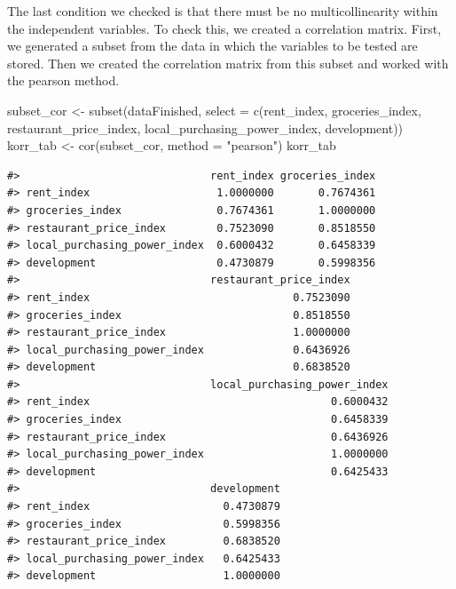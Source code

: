 \documentclass[
  11pt,
  a4paper,
  twoside]{scrbook}
\newenvironment{Shaded}{\begin{snugshade}}{\end{snugshade}}
\newcommand{\AttributeTok}[1]{\textcolor[rgb]{0.77,0.63,0.00}{#1}}
\newcommand{\FunctionTok}[1]{\textcolor[rgb]{0.00,0.00,0.00}{#1}}
\newcommand{\NormalTok}[1]{#1}
\newcommand{\OtherTok}[1]{\textcolor[rgb]{0.56,0.35,0.01}{#1}}
\newcommand{\StringTok}[1]{\textcolor[rgb]{0.31,0.60,0.02}{#1}}
\begin{document}
The last condition we checked is that there must be no multicollinearity within the independent variables.
To check this, we created a correlation matrix. First, we generated a subset from the data in which the variables to be tested are stored. Then we created the correlation matrix from this subset and worked with the pearson method.

\linespread{1}

\begin{Shaded}
\begin{Highlighting}[]
\NormalTok{subset\_cor }\OtherTok{\textless{}{-}} \FunctionTok{subset}\NormalTok{(dataFinished, }\AttributeTok{select =} \FunctionTok{c}\NormalTok{(rent\_index, groceries\_index, restaurant\_price\_index, local\_purchasing\_power\_index, development))}
\NormalTok{korr\_tab }\OtherTok{\textless{}{-}} \FunctionTok{cor}\NormalTok{(subset\_cor, }\AttributeTok{method =} \StringTok{"pearson"}\NormalTok{)}
\NormalTok{korr\_tab}
\end{Highlighting}
\end{Shaded}

\linespread{1}

\begin{verbatim}
#>                              rent_index groceries_index
#> rent_index                    1.0000000       0.7674361
#> groceries_index               0.7674361       1.0000000
#> restaurant_price_index        0.7523090       0.8518550
#> local_purchasing_power_index  0.6000432       0.6458339
#> development                   0.4730879       0.5998356
#>                              restaurant_price_index
#> rent_index                                0.7523090
#> groceries_index                           0.8518550
#> restaurant_price_index                    1.0000000
#> local_purchasing_power_index              0.6436926
#> development                               0.6838520
#>                              local_purchasing_power_index
#> rent_index                                      0.6000432
#> groceries_index                                 0.6458339
#> restaurant_price_index                          0.6436926
#> local_purchasing_power_index                    1.0000000
#> development                                     0.6425433
#>                              development
#> rent_index                     0.4730879
#> groceries_index                0.5998356
#> restaurant_price_index         0.6838520
#> local_purchasing_power_index   0.6425433
#> development                    1.0000000
\end{verbatim}
\end{document}
